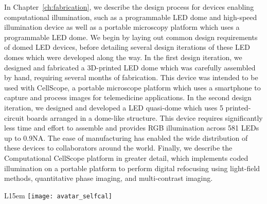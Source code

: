 In Chapter~\ref{ch:fabrication}, we describe the design process for devices enabling computational illumination, such as a programmable LED dome and high-speed illumination device as well as a portable microscopy platform which uses a programmable LED dome. We begin by laying out common design requirements of domed LED devices, before detailing several design iterations of these LED domes which were developed along the way. In the first design iteration, we designed and fabricated a 3D-printed LED dome which was carefully assembled by hand, requiring several months of fabrication. This device was intended to be used with CellScope, a portable microscope platform which uses a smartphone to capture and process images for telemedicine applications. In the second design iteration, we designed and developed a LED quasi-dome which uses 5 printed-circuit boards arranged in a dome-like structure. This device requires significantly less time and effort to assemble and provides RGB illumination across 581 LEDs up to 0.9NA. The ease of manufacturing has enabled the wide distribution of these devices to collaborators around the world. Finally, we describe the Computational CellScope platform in greater detail, which implements coded illumination on a portable platform to perform digital refocusing using light-field methods, quantitative phase imaging, and multi-contrast imaging.


\begin{wrapfigure}{L}{15em}
  \texttt{[image: avatar\_selfcal]}
\end{wrapfigure}


